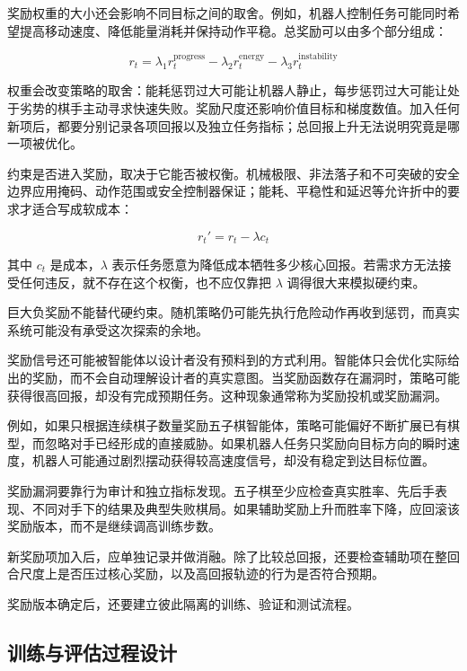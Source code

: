 奖励权重的大小还会影响不同目标之间的取舍。例如，机器人控制任务可能同时希望提高移动速度、降低能量消耗并保持动作平稳。总奖励可以由多个部分组成：

\begin{equation}
r_t
=
\lambda_1 r_t^{\mathrm{progress}}
-
\lambda_2 r_t^{\mathrm{energy}}
-
\lambda_3 r_t^{\mathrm{instability}}
\end{equation}

权重会改变策略的取舍：能耗惩罚过大可能让机器人静止，每步惩罚过大可能让处于劣势的棋手主动寻求快速失败。奖励尺度还影响价值目标和梯度数值。加入任何新项后，都要分别记录各项回报以及独立任务指标；总回报上升无法说明究竟是哪一项被优化。

约束是否进入奖励，取决于它能否被权衡。机械极限、非法落子和不可突破的安全边界应用掩码、动作范围或安全控制器保证；能耗、平稳性和延迟等允许折中的要求才适合写成软成本：

\begin{equation}
r_t'
=
r_t
-
\lambda c_t
\end{equation}

其中 $c_t$ 是成本，$\lambda$ 表示任务愿意为降低成本牺牲多少核心回报。若需求方无法接受任何违反，就不存在这个权衡，也不应仅靠把 $\lambda$ 调得很大来模拟硬约束。


巨大负奖励不能替代硬约束。随机策略仍可能先执行危险动作再收到惩罚，而真实系统可能没有承受这次探索的余地。

奖励信号还可能被智能体以设计者没有预料到的方式利用。智能体只会优化实际给出的奖励，而不会自动理解设计者的真实意图。当奖励函数存在漏洞时，策略可能获得很高回报，却没有完成预期任务。这种现象通常称为奖励投机或奖励漏洞。

例如，如果只根据连续棋子数量奖励五子棋智能体，策略可能偏好不断扩展已有棋型，而忽略对手已经形成的直接威胁。如果机器人任务只奖励向目标方向的瞬时速度，机器人可能通过剧烈摆动获得较高速度信号，却没有稳定到达目标位置。

奖励漏洞要靠行为审计和独立指标发现。五子棋至少应检查真实胜率、先后手表现、不同对手下的结果及典型失败棋局。如果辅助奖励上升而胜率下降，应回滚该奖励版本，而不是继续调高训练步数。

新奖励项加入后，应单独记录并做消融。除了比较总回报，还要检查辅助项在整回合尺度上是否压过核心奖励，以及高回报轨迹的行为是否符合预期。

奖励版本确定后，还要建立彼此隔离的训练、验证和测试流程。

\subsection{训练与评估过程设计}

